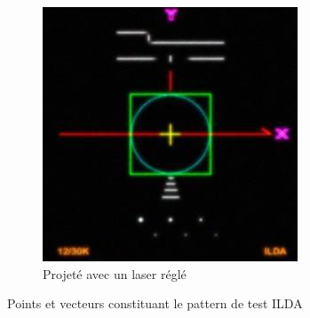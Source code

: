 \begin{fr}
\begin{figure}[ht]
\begin{bigcenter}
        \begin{subfigure}[b]{0.6\textwidth}
                \includegraphics[width=\textwidth]{images/comp/mire_reference.jpg}
                \caption{Projeté avec un laser réglé}
                \label{fig:ilda_pattern_proj}
        \end{subfigure}     
	\end{bigcenter}
\caption{Points et vecteurs constituant le pattern de test ILDA}
\label{fig:ilda_pattern}
\end{figure}
\end{fr}

